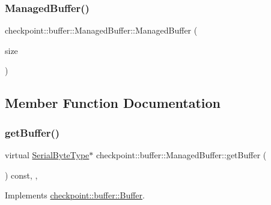 \subsubsection{\texorpdfstring{Managed\+Buffer()}{ManagedBuffer()}}
{\footnotesize\ttfamily checkpoint\+::buffer\+::\+Managed\+Buffer\+::\+Managed\+Buffer (\begin{DoxyParamCaption}\item[{\hyperlink{namespacecheckpoint_a083f6674da3f94c2901b18c6d238217c}{Serial\+Size\+Type} const \&}]{size }\end{DoxyParamCaption})\hspace{0.3cm}{\ttfamily [inline]}}



\subsection{Member Function Documentation}
\mbox{\label{structcheckpoint_1_1buffer_1_1_managed_buffer_a9a44d0c4e088ac080f13c84072a86e91}} 
\subsubsection{\texorpdfstring{get\+Buffer()}{getBuffer()}}
{\footnotesize\ttfamily virtual \hyperlink{namespacecheckpoint_ae57f01cdc0b81776c23b6c7c934c58f5}{Serial\+Byte\+Type}$\ast$ checkpoint\+::buffer\+::\+Managed\+Buffer\+::get\+Buffer (\begin{DoxyParamCaption}{ }\end{DoxyParamCaption}) const\hspace{0.3cm}{\ttfamily [inline]}, {\ttfamily [override]}, {\ttfamily [virtual]}}



Implements \hyperlink{structcheckpoint_1_1buffer_1_1_buffer_ad6a6457df5d7020cd3622d353eb8394b}{checkpoint\+::buffer\+::\+Buffer}.

\mbox{\label{structcheckpoint_1_1buffer_1_1_managed_buffer_a26f85bcd885624b7c0ad6fd8572ad466}} 
